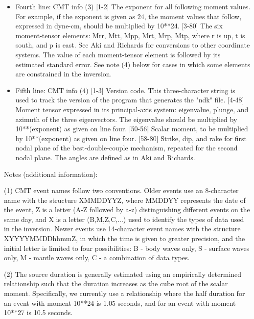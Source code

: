 \begin{itemize}
\item
Fourth line: CMT info (3)
[1-2]   The exponent for all following moment values. For example, if the
        exponent is given as 24, the moment values that follow, expressed in 
        dyne-cm, should be multiplied by 10**24.
[3-80]  The six moment-tensor elements: Mrr, Mtt, Mpp, Mrt, Mrp, Mtp, where r
        is up, t is south, and p is east. See Aki and Richards for conversions
        to other coordinate systems. The value of each moment-tensor
	  element is followed by its estimated standard error. See note (4)
	  below for cases in which some elements are constrained in the inversion.
        
\item
Fifth line: CMT info (4)
[1-3]   Version code. This three-character string is used to track the version 
        of the program that generates the "ndk" file.
[4-48]  Moment tensor expressed in its principal-axis system: eigenvalue, 
        plunge, and azimuth of the three eigenvectors. The eigenvalue should be
        multiplied by 10**(exponent) as given on line four.
[50-56] Scalar moment, to be multiplied by 10**(exponent) as given on line four.
[58-80] Strike, dip, and rake for first nodal plane of the best-double-couple 
        mechanism, repeated for the second nodal plane. The angles are defined
        as in Aki and Richards.

\end{itemize}
          
        
Notes (additional information):

(1) CMT event names follow two conventions. Older events use an 8-character 
name with the structure XMMDDYYZ, where MMDDYY represents the date of
the event, Z is a letter (A-Z followed by a-z) distinguishing different 
events on the same day, and X is a letter (B,M,Z,C,...) used to identify 
the types of data used in the inversion. Newer events use 14-character event 
names with the structure XYYYYMMDDhhmmZ, in which the time is given to greater
precision, and the initial letter is limited to four possibilities: B - body 
waves only, S - surface waves only, M - mantle waves only, C - a combination 
of data types.

(2) The source duration is generally estimated using an empirically determined
relationship such that the duration increases as the cube root of the scalar
moment. Specifically, we currently use a relationship where the half duration
for an event with moment 10**24 is 1.05 seconds, and for an event with moment
10**27 is 10.5 seconds.

